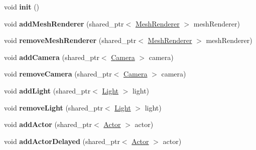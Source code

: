 \begin{DoxyCompactItemize}
\item 
\hypertarget{class_world_a0150607a49c2400d5c848159dd02d533}{}void {\bfseries init} ()\label{class_world_a0150607a49c2400d5c848159dd02d533}

\item 
\hypertarget{class_world_aa81c1e85043b43391dc11f3dde4d71b3}{}void {\bfseries add\+Mesh\+Renderer} (shared\+\_\+ptr$<$ \hyperlink{class_mesh_renderer}{Mesh\+Renderer} $>$ mesh\+Renderer)\label{class_world_aa81c1e85043b43391dc11f3dde4d71b3}

\item 
\hypertarget{class_world_ac36595803e9538b7df9c7b9a4dc19520}{}void {\bfseries remove\+Mesh\+Renderer} (shared\+\_\+ptr$<$ \hyperlink{class_mesh_renderer}{Mesh\+Renderer} $>$ mesh\+Renderer)\label{class_world_ac36595803e9538b7df9c7b9a4dc19520}

\item 
\hypertarget{class_world_a10249ad494f208c1c633b54dfeb7c5cf}{}void {\bfseries add\+Camera} (shared\+\_\+ptr$<$ \hyperlink{class_camera}{Camera} $>$ camera)\label{class_world_a10249ad494f208c1c633b54dfeb7c5cf}

\item 
\hypertarget{class_world_a95651f78e120154170a6b7a44b90f3cd}{}void {\bfseries remove\+Camera} (shared\+\_\+ptr$<$ \hyperlink{class_camera}{Camera} $>$ camera)\label{class_world_a95651f78e120154170a6b7a44b90f3cd}

\item 
\hypertarget{class_world_a3e8add1ddd07cc38f4514f6ff4677487}{}void {\bfseries add\+Light} (shared\+\_\+ptr$<$ \hyperlink{class_light}{Light} $>$ light)\label{class_world_a3e8add1ddd07cc38f4514f6ff4677487}

\item 
\hypertarget{class_world_a1db2ad77a6c442287a1f0fc6173366e9}{}void {\bfseries remove\+Light} (shared\+\_\+ptr$<$ \hyperlink{class_light}{Light} $>$ light)\label{class_world_a1db2ad77a6c442287a1f0fc6173366e9}

\item 
\hypertarget{class_world_a9809f7b08579210787eb36318a451da7}{}void {\bfseries add\+Actor} (shared\+\_\+ptr$<$ \hyperlink{class_actor}{Actor} $>$ actor)\label{class_world_a9809f7b08579210787eb36318a451da7}

\item 
\hypertarget{class_world_a5908f11edd93b6157073b6379c58bccb}{}void {\bfseries add\+Actor\+Delayed} (shared\+\_\+ptr$<$ \hyperlink{class_actor}{Actor} $>$ actor)\label{class_world_a5908f11edd93b6157073b6379c58bccb}


\end{DoxyCompactItemize}
